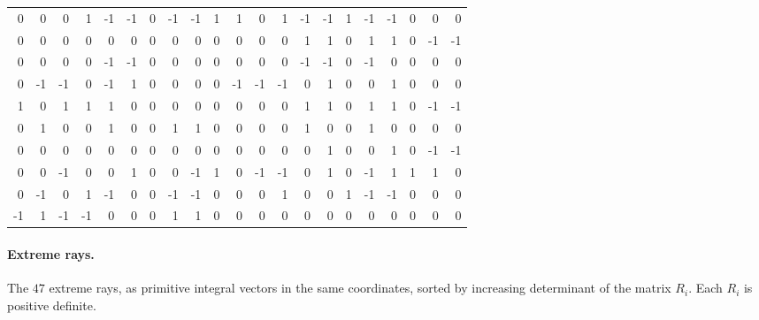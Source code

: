\begin{center}
\begin{tabular}{*{21}{r}}
0 & 0 & 0 & 1 & -1 & -1 & 0 & -1 & -1 & 1 & 1 & 0 & 1 & -1 & -1 & 1 & -1 & -1 & 0 & 0 & 0 \\
0 & 0 & 0 & 0 & 0 & 0 & 0 & 0 & 0 & 0 & 0 & 0 & 0 & 1 & 1 & 0 & 1 & 1 & 0 & -1 & -1 \\
0 & 0 & 0 & 0 & -1 & -1 & 0 & 0 & 0 & 0 & 0 & 0 & 0 & -1 & -1 & 0 & -1 & 0 & 0 & 0 & 0 \\
0 & -1 & -1 & 0 & -1 & 1 & 0 & 0 & 0 & 0 & -1 & -1 & -1 & 0 & 1 & 0 & 0 & 1 & 0 & 0 & 0 \\
1 & 0 & 1 & 1 & 1 & 0 & 0 & 0 & 0 & 0 & 0 & 0 & 0 & 1 & 1 & 0 & 1 & 1 & 0 & -1 & -1 \\
0 & 1 & 0 & 0 & 1 & 0 & 0 & 1 & 1 & 0 & 0 & 0 & 0 & 1 & 0 & 0 & 1 & 0 & 0 & 0 & 0 \\
0 & 0 & 0 & 0 & 0 & 0 & 0 & 0 & 0 & 0 & 0 & 0 & 0 & 0 & 1 & 0 & 0 & 1 & 0 & -1 & -1 \\
0 & 0 & -1 & 0 & 0 & 1 & 0 & 0 & -1 & 1 & 0 & -1 & -1 & 0 & 1 & 0 & -1 & 1 & 1 & 1 & 0 \\
0 & -1 & 0 & 1 & -1 & 0 & 0 & -1 & -1 & 0 & 0 & 0 & 1 & 0 & 0 & 1 & -1 & -1 & 0 & 0 & 0 \\
-1 & 1 & -1 & -1 & 0 & 0 & 0 & 1 & 1 & 0 & 0 & 0 & 0 & 0 & 0 & 0 & 0 & 0 & 0 & 0 & 0 \\
\end{tabular}
\end{center}

\paragraph{Extreme rays.}
The \(47\) extreme rays, as primitive integral vectors in the same
coordinates, sorted by increasing determinant of the matrix \(R_i\).  Each
\(R_i\) is positive definite.

